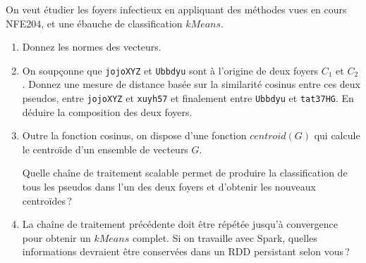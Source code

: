 \documentclass[11pt,a4paper]{article}
\begin{document}
On veut étudier les foyers infectieux en appliquant des méthodes vues en cours NFE204,
et une ébauche de classification $kMeans$. 
\begin{enumerate}
   \item Donnez les normes des vecteurs.
  \item On soupçonne que \texttt{jojoXYZ} et \texttt{Ubbdyu} sont à l'origine de 
  deux foyers $C_1$ et $C_2$. Donnez une mesure de distance basée
  sur la similarité cosinus entre ces deux pseudos, entre 
  \texttt{jojoXYZ} et \texttt{xuyh57} et finalement entre
   \texttt{Ubbdyu} et \texttt{tat37HG}.
  En déduire la composition des deux foyers.
  
  \item Outre la fonction cosinus, on dispose d'une fonction $centroid(G)$ qui calcule le centroïde
  d'un ensemble de vecteurs $G$.
  
  Quelle chaîne de traitement scalable permet de produire la classification
  de tous les pseudos dans l'un des deux foyers et d'obtenir
  les nouveaux centroïdes\,? 
  
  \item La chaîne de traitement précédente doit être répétée
     jusqu'à convergence pour obtenir un $kMeans$ complet. Si  on travaille
     avec Spark, quelles informations devraient être conservées dans
     un RDD persistant selon vous\,?
\end{enumerate}
\end{document}
